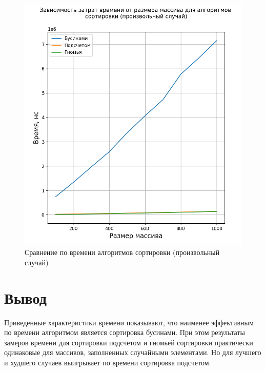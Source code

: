 \begin{figure}[H]
	\begin{center}
		\includegraphics[scale=0.67]{img/time_rand.png}
	\end{center}
	\captionsetup{justification=centering}
	\caption{Сравнение по времени алгоритмов сортировки (произвольный случай)}
	\label{img:time_rand}
\end{figure}

\section{Вывод}
Приведенные характеристики времени показывают, что наименее эффективным по времени алгоритмом является сортировка бусинами. При этом результаты замеров времени для сортировки подсчетом и гномьей сортировки практически одинаковые для массивов, заполненных случайными элементами. Но для лучшего и худшего случаев выигрывает по времени сортировка подсчетом.